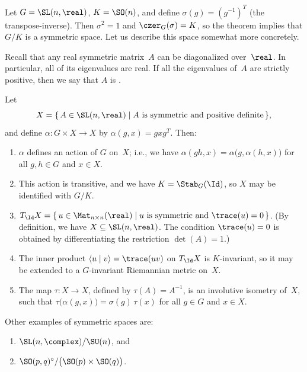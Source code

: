 \begin{eg} \label{SLnSymm}
 Let $G = \SL(n,\real)$, $K = \SO(n)$, and define $\sigma(g) =
(g^{-1})^T$ (the transpose-inverse). Then $\sigma^2 = 1$ and
$\czer_G(\sigma) = K$, so the theorem implies that $G/K$ is a symmetric
space. Let us describe this space somewhat more concretely.

Recall that any real symmetric matrix~$A$ can be diagonalized
over~$\real$. In particular, all of its eigenvalues are real. If all the
eigenvalues of~$A$ are strictly positive, then we say that $A$ is
.

Let 
 $$X = \{\, A \in \SL(n,\real) \mid 
 \mbox{$A$ is symmetric and positive definite} \,\} ,$$
 and define $\alpha \colon G \times X \to X$ by 
 $\alpha(g,x) = g x g^T$. 
 Then:
 \begin{enumerate} \renewcommand{\theenumi}{\alph{enumi}}
 \item \label{SLnSymm-act}
 $\alpha$ defines an action of $G$ on~$X$; i.e., we have
$\alpha(gh,x) = \alpha \bigl( g, \alpha(h,x) \bigr)$ for all $g,h \in G$
and $x \in X$.
\item \label{SLnSymm-G/K}
This action is transitive, and we have $K = \Stab_G(\Id)$, so $X$ may be
identified with $G/K$.
 \item \label{SLnSymm-TX}
 $T_{\Id} X = 
 \{\, u \in \Mat_{n\times n}(\real) \mid 
 \mbox{$u$ is symmetric and $\trace(u) = 0$} \,\} $. (By definition,
we have $X \subseteq \SL(n,\real)$. The condition $\trace(u) = 0$ is obtained by differentiating the restriction $\det(A) = 1$.)
 \item \label{SLnSymm-<>}
 The inner product $\langle u \mid v \rangle = \trace(uv)$ on
$T_{\Id} X$ is $K$-invariant, so it may be extended to a $G$-invariant
Riemannian metric on~$X$.
 \item \label{SLnSymm-tau}
 The map $\tau \colon X \to X$, defined by $\tau(A) = A^{-1}$, is an
involutive isometry of~$X$, such that 
 $\tau \bigl( \alpha(g,x) \bigr) = \sigma(g) \, \tau(x)$ for all $g
\in G$ and $x \in X$.
 \end{enumerate}
 \end{eg}

\begin{eg}
 Other examples of symmetric spaces are:
 \begin{enumerate}
 \item $\SL(n,\complex)/\SU(n)$, and
 \item $\SO(p,q)^\circ / \bigl( \SO(p) \times \SO(q) \bigr) $.
 \end{enumerate}
 \end{eg}

